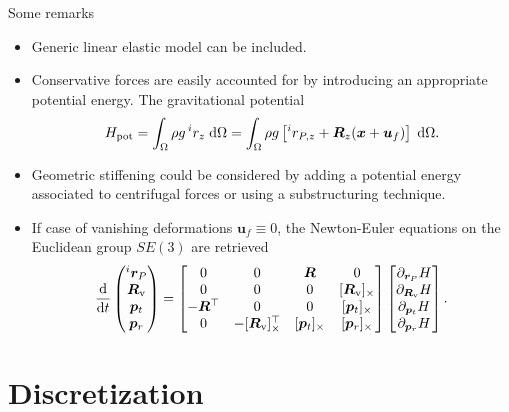 \documentclass[aspectratio=169]{ISAE-Beamer}
\newcommand{\crmat}[1]{\ensuremath{[#1]_{\times}}}
\begin{document}
\begin{frame}{Some remarks}

\begin{itemize}
	\item Generic linear elastic model can be included.
	\item Conservative forces are easily accounted for by introducing an appropriate potential energy. The gravitational potential
	\begin{equation*}
	H_{\text{pot}} = \int_{\Omega} \rho g \, ^i r_z \d{\Omega} = \int_{\Omega} \rho g \left[ ^i r_{P, z} +\bm{R}_z (\bm{x} + \bm{u}_f) \right] \d{\Omega}.
	\end{equation*}
	\item Geometric stiffening could be considered by adding a potential energy associated to centrifugal forces or using a substructuring technique.
	\item If case of vanishing deformations $\bm{u}_f \equiv 0$, the Newton-Euler equations on the Euclidean group $SE(3)$ are retrieved
	\begin{equation*}
	\diff{}{t}
	\begin{pmatrix}
	^i{\bm{r}}_P \\
	\bm{R}_{\mathrm{v}} \\
	{\bm{p}}_t \\ 
	{\bm{p}}_r \\
	\end{pmatrix} = 
	\begin{bmatrix}
	0 & 0 & \bm{R} & 0 \\
	0 & 0 & 0 & \crmat{\bm{R}_{\text{v}}} \\
	- \bm{R}^\top & 0 & 0 & \crmat{\bm{p}_t}\\
	0 & -\crmat{\bm{R}_{\text{v}}}^\top & \crmat{\bm{p}_t} & \crmat{\bm{p}_r} \\
	\end{bmatrix}
	\begin{bmatrix}
	\partial_{\bm{r}_P} H \\ 
	\partial_{\bm{R}_{\text{v}}} H \\ 
	\partial_{\bm{p}_t} H \\ 
	\partial_{\bm{p}_r} H \\ 
	\end{bmatrix}.
	\end{equation*}
\end{itemize}
\end{frame}

\section{Discretization}
\end{document}
